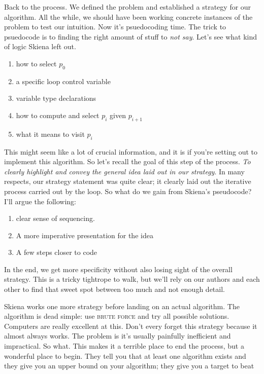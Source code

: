 \documentclass[]{tufte-handout}
\begin{document}
Back to the process.  We defined the problem and established a strategy for our algorithm. All the while, we should have been working concrete instances of the problem to test our intuition.  Now it's psuedocoding time.  The trick to psuedocode is to finding the right amount of stuff to \textit{not say}. Let's see what kind of logic Skiena left out.
\begin{enumerate}
\item how to select $p_0$
\item a specific loop control variable
\item variable type declarations
\item how to compute and select $p_i$ given $p_{i+1}$
\item what it means to visit $p_i$
\end{enumerate}
This might seem like a lot of crucial information, and it is if you're setting out to implement this algorithm. So let's recall the goal of this step of the process. \textit{To clearly highlight and convey the general idea laid out in our strategy}. In many respects, our strategy statement was quite clear; it clearly laid out the iterative process carried out by the loop.  So what do we gain from Skiena's pseudocode? I'll argue the following:
\begin{enumerate}
\item clear sense of sequencing. 
\item A more imperative presentation for the idea
\item A few steps closer to code
\end{enumerate}
In the end, we get more specificity without also losing sight of the overall strategy. This is a tricky tightrope to walk, but we'll rely on our authors and each other to find that sweet spot between too much and not enough detail.

Skiena works one more strategy before landing on an actual algorithm. The algorithm is dead simple: use \textsc{brute force} and try all possible solutions. Computers are really excellent at this. Don't every forget this strategy because it almost always works. The problem is it's usually painfully inefficient and impractical. So what. This makes it a terrible place to end the process, but a wonderful place to begin. They tell you that at least one algorithm exists and they give you an upper bound on your algorithm; they give you a target to beat
\end{document}

